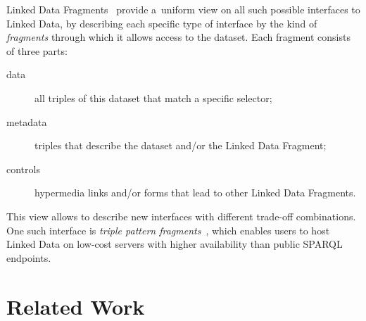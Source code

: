 \documentclass[letterpaper]{article}
\begin{document}
Linked Data Fragments~\cite{verborgh2014ldfiswc}
provide a~uniform view on all such possible interfaces to Linked Data,
by describing each specific type of interface
by the kind of \emph{fragments} through which it allows access to the dataset.
Each fragment consists of three parts:
\begin{description}
  \item[data] all triples of this dataset that match a specific selector;
  \item[metadata] triples that describe the dataset and/or the Linked Data Fragment;
  \item[controls] hypermedia links and/or forms that lead to other Linked Data Fragments.
\end{description}
This view allows to describe new interfaces
with different trade-off combinations.
One such interface is \emph{triple pattern fragments}~\cite{verborgh2014ldfiswc},
which enables users to host Linked Data
on low-cost servers with higher availability
than public SPARQL endpoints.

\section{Related Work}
\end{document}
